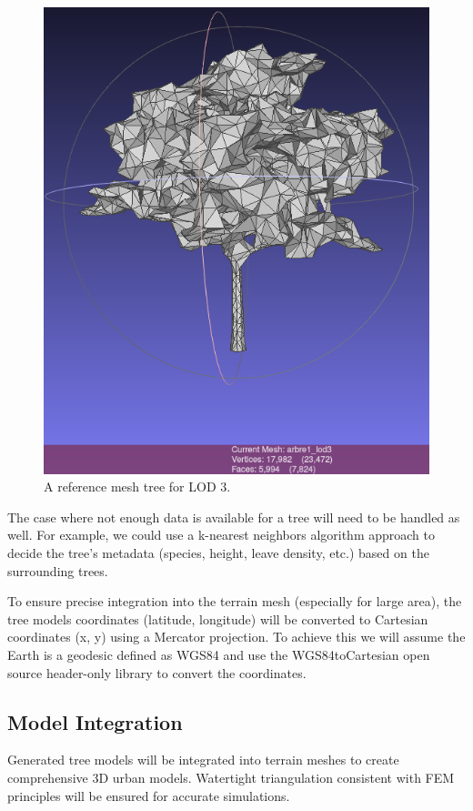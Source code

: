 \documentclass[12pt]{article}
\begin{document}
\begin{figure}[H]
\begin{minipage}{0.45\textwidth}
        \includegraphics[width=\textwidth]{images/lod3.png}
        \caption{A reference mesh tree for LOD 3.}
    \end{minipage}
\end{figure}

The case where not enough data is available for a tree will need to be handled
as well. For example, we could use a k-nearest neighbors algorithm \cite{k-NN} approach to
decide the tree's metadata (species, height, leave density, etc.) based on the
surrounding trees.

To ensure precise integration into the terrain mesh (especially for large area), the tree models coordinates
(latitude, longitude) will be converted to Cartesian coordinates (x, y) using
a Mercator projection\cite{mercator-proj}. To achieve this we will assume the Earth is a geodesic
defined as WGS84 \cite{wgs84} and use the WGS84toCartesian\cite{wgs84_to_cartesian} open source header-only
  library to convert the coordinates.

\subsection{Model Integration}
Generated tree models will be integrated into terrain meshes to create comprehensive 
3D urban models. Watertight triangulation consistent with FEM principles will be ensured 
for accurate simulations.
\end{document}
